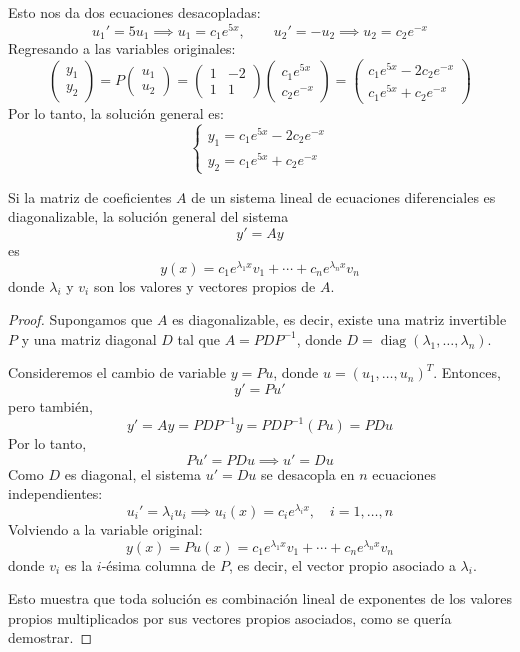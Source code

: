 \begin{example}
\begin{myproof}
Esto nos da dos ecuaciones desacopladas:
\[
u_1' = 5u_1 \implies u_1 = c_1 e^{5x}, \qquad u_2' = -u_2 \implies u_2 = c_2 e^{-x}
\]
Regresando a las variables originales:
\[
\begin{pmatrix}
y_1 \\ y_2
\end{pmatrix}
= P
\begin{pmatrix}
u_1 \\ u_2
\end{pmatrix}
= \begin{pmatrix}
1 & -2 \\
1 & 1
\end{pmatrix}
\begin{pmatrix}
c_1 e^{5x} \\ c_2 e^{-x}
\end{pmatrix}
= \begin{pmatrix}
c_1 e^{5x} - 2c_2 e^{-x} \\
c_1 e^{5x} + c_2 e^{-x}
\end{pmatrix}
\]
Por lo tanto, la solución general es:
\[
\boxed{
\begin{cases}
y_1 = c_1 e^{5x} - 2c_2 e^{-x} \\
y_2 = c_1 e^{5x} + c_2 e^{-x}
\end{cases}
}
\]
\end{myproof}
\end{example}

\begin{theorem}
Si la matriz de coeficientes $A$ de un sistema lineal de ecuaciones diferenciales es diagonalizable, la solución general del sistema
\[
y' = Ay
\]
es
\[
y(x) = c_1 e^{\lambda_1 x} v_1 + \cdots + c_n e^{\lambda_n x} v_n
\]
donde $\lambda_i$ y $v_i$ son los valores y vectores propios de $A$.
\end{theorem}

\begin{proof}
Supongamos que $A$ es diagonalizable, es decir, existe una matriz invertible $P$ y una matriz diagonal $D$ tal que $A = P D P^{-1}$, donde $D = \operatorname{diag}(\lambda_1, \dots, \lambda_n)$.

Consideremos el cambio de variable $y = P u$, donde $u = (u_1, \dots, u_n)^T$. Entonces,
\[
y' = P u'
\]
pero también,
\[
y' = A y = P D P^{-1} y = P D P^{-1} (P u) = P D u
\]
Por lo tanto,
\[
P u' = P D u \implies u' = D u
\]
Como $D$ es diagonal, el sistema $u' = D u$ se desacopla en $n$ ecuaciones independientes:
\[
u_i' = \lambda_i u_i \implies u_i(x) = c_i e^{\lambda_i x}, \quad i = 1, \dots, n
\]
Volviendo a la variable original:
\[
y(x) = P u(x) = c_1 e^{\lambda_1 x} v_1 + \cdots + c_n e^{\lambda_n x} v_n
\]
donde $v_i$ es la $i$-ésima columna de $P$, es decir, el vector propio asociado a $\lambda_i$.

Esto muestra que toda solución es combinación lineal de exponentes de los valores propios multiplicados por sus vectores propios asociados, como se quería demostrar.
\end{proof}


